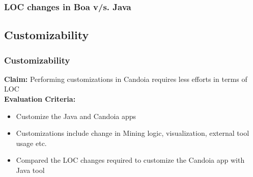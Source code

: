         \begin{frame}
            \frametitle{LOC changes in Boa v/s. Java}
            
         \end{frame}

 \subsection{Customizability}
        \begin{frame}
            \frametitle{Customizability}
            \textbf{Claim:} Performing customizations in Candoia requires less efforts in terms of LOC \\
            \textbf{Evaluation Criteria:}
            \begin{itemize}
                \item Customize the Java and Candoia apps
                \item Customizations include change in Mining logic, visualization, external tool usage etc.
                \item Compared the LOC changes required to customize the Candoia app with Java tool
            \end{itemize}
         \end{frame}

        \begin{frame}
            
         \end{frame}